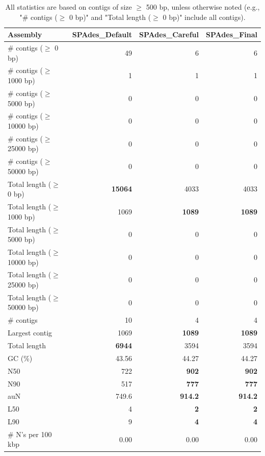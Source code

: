 \documentclass[12pt,a4paper]{article}
\begin{document}
\begin{table}[ht]
\begin{center}
\caption{All statistics are based on contigs of size $\geq$ 500 bp, unless otherwise noted (e.g., "\# contigs ($\geq$ 0 bp)" and "Total length ($\geq$ 0 bp)" include all contigs).}
\begin{tabular}{|l*{3}{|r}|}
\hline
Assembly & SPAdes\_Default & SPAdes\_Careful & SPAdes\_Final \\ \hline
\# contigs ($\geq$ 0 bp) & 49 & 6 & 6 \\ \hline
\# contigs ($\geq$ 1000 bp) & 1 & 1 & 1 \\ \hline
\# contigs ($\geq$ 5000 bp) & 0 & 0 & 0 \\ \hline
\# contigs ($\geq$ 10000 bp) & 0 & 0 & 0 \\ \hline
\# contigs ($\geq$ 25000 bp) & 0 & 0 & 0 \\ \hline
\# contigs ($\geq$ 50000 bp) & 0 & 0 & 0 \\ \hline
Total length ($\geq$ 0 bp) & {\bf 15064} & 4033 & 4033 \\ \hline
Total length ($\geq$ 1000 bp) & 1069 & {\bf 1089} & {\bf 1089} \\ \hline
Total length ($\geq$ 5000 bp) & 0 & 0 & 0 \\ \hline
Total length ($\geq$ 10000 bp) & 0 & 0 & 0 \\ \hline
Total length ($\geq$ 25000 bp) & 0 & 0 & 0 \\ \hline
Total length ($\geq$ 50000 bp) & 0 & 0 & 0 \\ \hline
\# contigs & 10 & 4 & 4 \\ \hline
Largest contig & 1069 & {\bf 1089} & {\bf 1089} \\ \hline
Total length & {\bf 6944} & 3594 & 3594 \\ \hline
GC (\%) & 43.56 & 44.27 & 44.27 \\ \hline
N50 & 722 & {\bf 902} & {\bf 902} \\ \hline
N90 & 517 & {\bf 777} & {\bf 777} \\ \hline
auN & 749.6 & {\bf 914.2} & {\bf 914.2} \\ \hline
L50 & 4 & {\bf 2} & {\bf 2} \\ \hline
L90 & 9 & {\bf 4} & {\bf 4} \\ \hline
\# N's per 100 kbp & 0.00 & 0.00 & 0.00 \\ \hline
\end{tabular}
\end{center}
\end{table}
\end{document}
